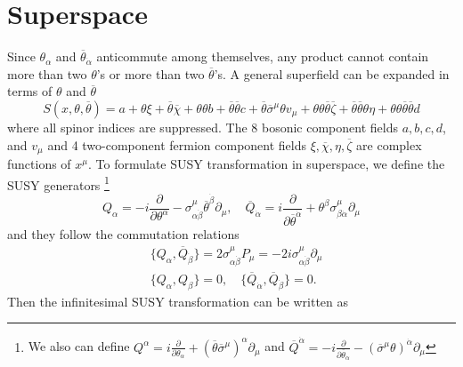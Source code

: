 \documentclass[12pt]{report}
\begin{document}
\section{Superspace}
Since $\theta_{\alpha}$ and $\overline{\theta}_{\dot{\alpha}}$ anticommute among themselves, any product cannot contain more than two $\theta$'s or more than two $\overline{\theta}$'s.
A general superfield can be expanded in terms of $\theta$ and $\overline{\theta}$
\begin{equation}
S(x, \theta, \overline{\theta}) = a + \theta \xi + \overline{\theta} \overline{\chi} + \theta \theta b + \overline{\theta} \overline{\theta} c + \overline{\theta} \overline{\sigma}^{\mu} \theta v_{\mu} + \theta \theta \overline{\theta} \overline{\zeta} + \overline{\theta} \overline{\theta} \theta \eta + \theta \theta \overline{\theta} \overline{\theta} d
\end{equation}
where all spinor indices are suppressed.
The 8 bosonic component fields $a, b, c, d$, and $v_{\mu}$ and 4 two-component fermion component fields $\xi, \overline{\chi}, \eta, \overline{\zeta}$ are complex functions of $x^{\mu}$.
To formulate SUSY transformation in superspace, we define the SUSY generators 
\footnote{We also can define 
$Q^{\alpha} = i \frac{\partial}{\partial \theta_{\alpha}} + (\overline{\theta} \overline{\sigma}^{\mu})^{\alpha} \partial_{\mu}$ and 
$\overline{Q}^{\dot{\alpha}} = -i \frac{\partial}{\partial \overline{\theta}_{\dot{\alpha}}} - (\overline{\sigma}^{\mu} \theta)^{\dot{\alpha}} \partial_{\mu}$}
\begin{equation}
Q_{\alpha} = -i \frac{\partial}{\partial \theta^{\alpha}} - \sigma^{\mu}_{\alpha \dot{\beta}} \overline{\theta}^{\dot{\beta}} \partial_{\mu}, \quad 
\overline{Q}_{\dot{\alpha}} = i \frac{\partial}{\partial \overline{\theta}^{\dot{\alpha}}} + \theta^{\beta} \sigma^{\mu}_{\beta \dot{\alpha}} \partial_{\mu}
\end{equation}
and they follow the commutation relations
\begin{align}
& \{Q_{\alpha}, \overline{Q}_{\dot{\beta}}\} = 2 \sigma^{\mu}_{\alpha \dot{\beta}} P_{\mu} = -2i \sigma^{\mu}_{\alpha \dot{\beta}} \partial_{\mu} \\
& \{Q_{\alpha}, Q_{\beta}\} = 0, \quad 
\{\overline{Q}_{\dot{\alpha}}, \overline{Q}_{\dot{\beta}}\} = 0 .
\end{align}
Then the infinitesimal SUSY transformation can be written as
\end{document}
